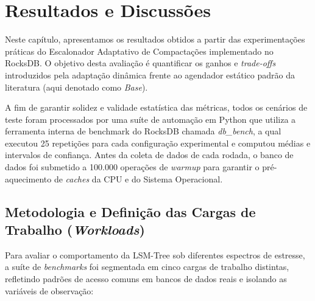 \chapter{Resultados e Discussões}
\label{cap:resultados}

Neste capítulo, apresentamos os resultados obtidos a partir das experimentações práticas do Escalonador Adaptativo de Compactações implementado no RocksDB. O objetivo desta avaliação é quantificar os ganhos e \textit{trade-offs} introduzidos pela adaptação dinâmica frente ao agendador estático padrão da literatura (aqui denotado como \textit{Base}). 

A fim de garantir solidez e validade estatística das métricas, todos os cenários de teste foram processados por uma suíte de automação em Python que utiliza a ferramenta interna de benchmark do RocksDB chamada \textit{db\_bench}, a qual executou 25 repetições para cada configuração experimental e computou médias e intervalos de confiança. Antes da coleta de dados de cada rodada, o banco de dados foi submetido a 100.000 operações de \textit{warmup} para garantir o pré-aquecimento de \textit{caches} da CPU e do Sistema Operacional.

\section{Metodologia e Definição das Cargas de Trabalho (\textit{Workloads})}

Para avaliar o comportamento da LSM-Tree sob diferentes espectros de estresse, a suíte de \textit{benchmarks} foi segmentada em cinco cargas de trabalho distintas, refletindo padrões de acesso comuns em bancos de dados reais e isolando as variáveis de observação:

